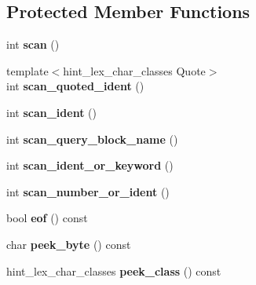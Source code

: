 \subsection*{Protected Member Functions}
\begin{DoxyCompactItemize}
\item 
\mbox{\label{classHint__scanner_a311d16f719c42acb8229e9efe44dfa61}} 
int {\bfseries scan} ()
\item 
\mbox{\label{classHint__scanner_a1a654400df1cbf002b544df930ce2f10}} 
{\footnotesize template$<$hint\+\_\+lex\+\_\+char\+\_\+classes Quote$>$ }\\int {\bfseries scan\+\_\+quoted\+\_\+ident} ()
\item 
\mbox{\label{classHint__scanner_a1d7ee4324a8b078149d21406e365f201}} 
int {\bfseries scan\+\_\+ident} ()
\item 
\mbox{\label{classHint__scanner_a45e6781d3d4243967310ae8d22724ddc}} 
int {\bfseries scan\+\_\+query\+\_\+block\+\_\+name} ()
\item 
\mbox{\label{classHint__scanner_adaba79488a89db0af5a6911ae6b2da7a}} 
int {\bfseries scan\+\_\+ident\+\_\+or\+\_\+keyword} ()
\item 
\mbox{\label{classHint__scanner_ab796ad4f94a523c5bae57975682931d5}} 
int {\bfseries scan\+\_\+number\+\_\+or\+\_\+ident} ()
\item 
\mbox{\label{classHint__scanner_a35bd11f96efe6043e771444b8faaab5f}} 
bool {\bfseries eof} () const
\item 
\mbox{\label{classHint__scanner_ac20fe88210a157fd39434ead78291669}} 
char {\bfseries peek\+\_\+byte} () const
\item 
\mbox{\label{classHint__scanner_a58fe74cd0ac49e6f78fc2bff85a88882}} 
hint\+\_\+lex\+\_\+char\+\_\+classes {\bfseries peek\+\_\+class} () const
\item 
\mbox{\label{classHint__scanner_aae38d4208aafc0b8f67c120eb2771773}} 

\end{DoxyCompactItemize}
